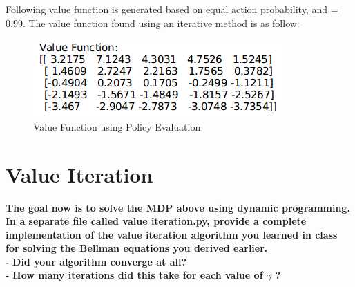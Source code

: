 \documentclass[11pt]{article}
\begin{document}
\noindent
Following value function is generated based on equal action probability, and  =
0.99. The value function found using an iterative method is as follow:
\\

\begin{figure}[h]
\includegraphics[scale=0.6]{v_evaluation}
\centering
\caption{Value Function using Policy Evaluation}
\end{figure}



\newpage
\section{Value Iteration}
\textbf{The goal now is to solve the MDP above using dynamic programming. In a separate
file called value iteration.py, provide a complete implementation of the value
iteration algorithm you learned in class for solving the Bellman equations you
derived earlier.}
\\

\noindent
\textbf{-}
\noindent
\textbf{Did your algorithm converge at all?}
\\

\noindent
\textbf{-}
\noindent
\textbf{How many iterations did this take for each value of $\gamma$ ?}
\\



\end{document}
